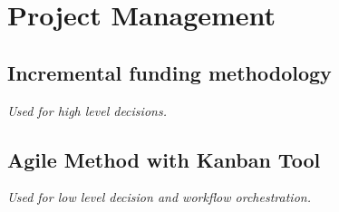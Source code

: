 %
%
\chapter{Project Management}

\section{Incremental funding methodology}

\textit{Used for high level decisions.}

\section{Agile Method with Kanban Tool}

\textit{Used for low level decision and workflow orchestration.}

\clearpage